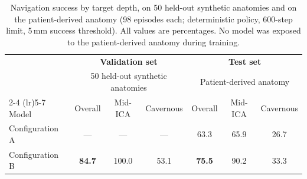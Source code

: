 %
%

\begin{table}[ht]
\caption{Navigation success by target depth, on 50 held-out synthetic anatomies and on the
patient-derived anatomy (98 episodes each; deterministic policy, 600-step limit, 5\,mm success
threshold). All values are percentages. No model was exposed to the patient-derived anatomy
during training.}
\label{tab:success}
\begin{center}
\begin{tabular}{l ccc | ccc}
\toprule
 & \multicolumn{3}{c|}{\textbf{Validation set}} & \multicolumn{3}{c}{\textbf{Test set}} \\
 & \multicolumn{3}{c|}{50 held-out synthetic anatomies} & \multicolumn{3}{c}{Patient-derived anatomy} \\
\cmidrule(lr){2-4} \cmidrule(lr){5-7}
Model & Overall & Mid-ICA & Cavernous & Overall & Mid-ICA & Cavernous \\
\midrule
Configuration A & ---            & ---   & ---            & 63.3          & 65.9 & 26.7 \\
Configuration B & \textbf{84.7}  & 100.0 & 53.1           & \textbf{75.5} & 90.2 & 33.3 \\
\bottomrule
\end{tabular}
\end{center}
\end{table}

